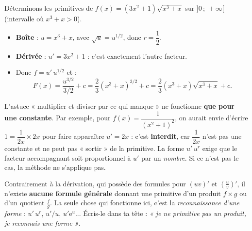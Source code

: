 \documentclass[11pt]{article}
\begin{document}
\begin{exemplebox}
Déterminons les primitives de $f(x) = (3x^{2}+1)\sqrt{x^{3}+x}$ sur $]0\,;\,+\infty[$ (intervalle où $x^3+x>0$).
\begin{itemize}
\item \textbf{Boîte} : $u = x^{3}+x$, avec $\sqrt{u} = u^{1/2}$, donc $r = \dfrac{1}{2}$.
\item \textbf{Dérivée} : $u' = 3x^{2}+1$ : c'est exactement l'autre facteur.
\item Donc $f = u'\,u^{1/2}$ et :
\[ F(x) = \frac{u^{3/2}}{3/2} + c = \frac{2}{3}\left(x^{3}+x\right)^{3/2} + c = \frac{2}{3}\left(x^{3}+x\right)\sqrt{x^{3}+x} + c. \]
\end{itemize}
\end{exemplebox}

\begin{attention}
L'astuce « multiplier et diviser par ce qui manque » ne fonctionne \textbf{que pour une constante}. Par exemple, pour $f(x) = \dfrac{1}{(x^2+1)^2}$, on aurait envie d'écrire $1 = \dfrac{1}{2x}\times 2x$ pour faire apparaître $u' = 2x$ : c'est \textbf{interdit}, car $\dfrac{1}{2x}$ n'est pas une constante et ne peut pas « sortir » de la primitive. La forme $u'\,u^r$ exige que le facteur accompagnant soit proportionnel à $u'$ par un \emph{nombre}. Si ce n'est pas le cas, la méthode ne s'applique pas.
\end{attention}

\begin{attention}
Contrairement à la dérivation, qui possède des formules pour $(uv)'$ et $\left(\frac{u}{v}\right)'$, il n'existe \textbf{aucune formule générale} donnant une primitive d'un produit $f\times g$ ou d'un quotient $\frac{f}{g}$. La seule chose qui fonctionne ici, c'est la \emph{reconnaissance d'une forme} : $u'\,u^r$, $u'/u$, $u'\mathrm{e}^{u}$... Écris-le dans ta tête : \emph{« je ne primitive pas un produit, je reconnais une forme »}.
\end{attention}
\end{document}
